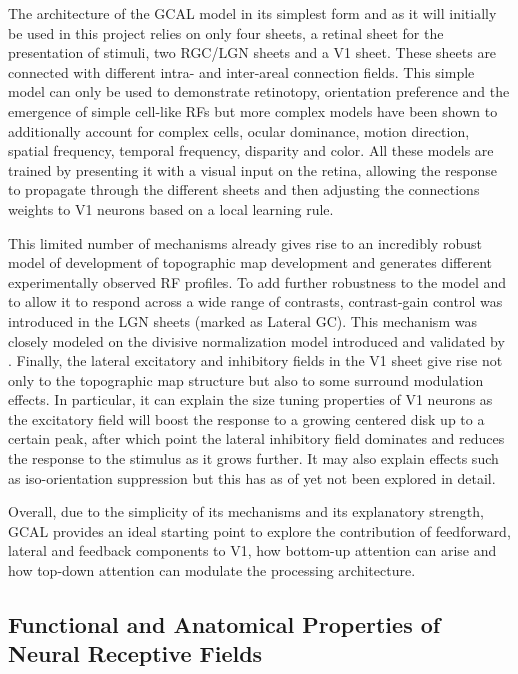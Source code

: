 The architecture of the GCAL model in its simplest form and as it will
initially be used in this project relies on only four sheets, a
retinal sheet for the presentation of stimuli, two RGC/LGN sheets and
a V1 sheet. These sheets are connected with different intra- and
inter-areal connection fields. This simple model can only be used to
demonstrate retinotopy, orientation preference and the emergence of
simple cell-like RFs but more complex models have been shown to
additionally account for complex cells, ocular dominance, motion
direction, spatial frequency, temporal frequency, disparity and
color. All these models are trained by presenting it with a visual
input on the retina, allowing the response to propagate through the
different sheets and then adjusting the connections weights to V1
neurons based on a local learning rule.

This limited number of mechanisms already gives rise to an incredibly
robust model of development of topographic map development and
generates different experimentally observed RF profiles. To add
further robustness to the model and to allow it to respond across a
wide range of contrasts, contrast-gain control was introduced in the
LGN sheets (marked as Lateral GC). This mechanism was closely modeled
on the divisive normalization model introduced and validated by
\cite{Bonin2005}. Finally, the lateral excitatory and inhibitory
fields in the V1 sheet give rise not only to the topographic map
structure but also to some surround modulation effects. In particular,
it can explain the size tuning properties of V1 neurons as the
excitatory field will boost the response to a growing centered disk up
to a certain peak, after which point the lateral inhibitory field
dominates and reduces the response to the stimulus as it grows
further. It may also explain effects such as iso-orientation
suppression but this has as of yet not been explored in detail.

Overall, due to the simplicity of its mechanisms and its explanatory
strength, GCAL provides an ideal starting point to explore the
contribution of feedforward, lateral and feedback components to V1,
how bottom-up attention can arise and how top-down attention can
modulate the processing architecture.

\subsection{Functional and Anatomical Properties of Neural Receptive Fields}


